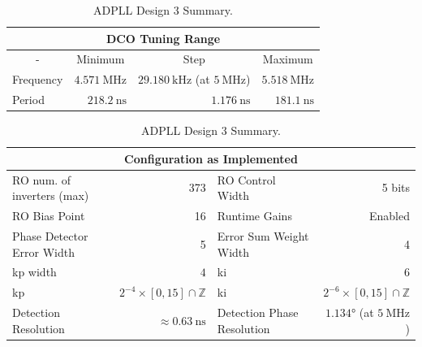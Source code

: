 \begin{table}[!h]
    \begin{center}
        \begin{tabular}{|l|r|r|r|}
            \multicolumn{4}{c}{\ac{DCO} Tuning Range} \T\\
            \hline
            \multicolumn{1}{|c|}{-} & \multicolumn{1}{c|}{Minimum} & \multicolumn{1}{c|}{Step} & \multicolumn{1}{c|}{Maximum} \T\\
            \hline
            Frequency & $4.571~\si{\mega\hertz}$ & $29.180~\si{\kilo\hertz}$ (at $5~\si{\mega\hertz}$) & $5.518~\si{\mega\hertz}$ \T\\
            \hline
            Period & $218.2~\si{\nano\second}$ & $1.176~\si{\nano\second}$ & $181.1~\si{\nano\second}$ \T\\
            \hline
        \end{tabular}
        \begin{tabular}{|l|r|l|r|}
            \multicolumn{4}{c}{Configuration as Implemented} \T\\
            \hline
            \ac{RO} num. of inverters (max) & 373 & \ac{RO} Control Width & 5 bits \T\\
            \hline
            \ac{RO} Bias Point & 16 & Runtime Gains & Enabled \T\\
            \hline
            Phase Detector Error Width & 5 & Error Sum Weight Width & 4 \T\\
            \hline
            \acs{kp} width & $4$ & \acs{ki} & $6$ \T\\
            \hline
            \acs{kp} & $2^{-4}\times[0,15]\cap\mathbb{Z}$ & \acs{ki} & $2^{-6}\times[0,15]\cap\mathbb{Z}$ \T\\
            \hline
            Detection Resolution & $\approx0.63~\si{\nano\second}$ & Detection Phase Resolution & $1.134\si{\degree}$ (at $5~\si{\mega\hertz}$)\\
            \hline
        \end{tabular}
    \end{center}
    \caption[\ac{ADPLL} Design 3 Summary]{\ac{ADPLL} Design 3 Summary.}
    \label{table:adpll3}
\end{table}

